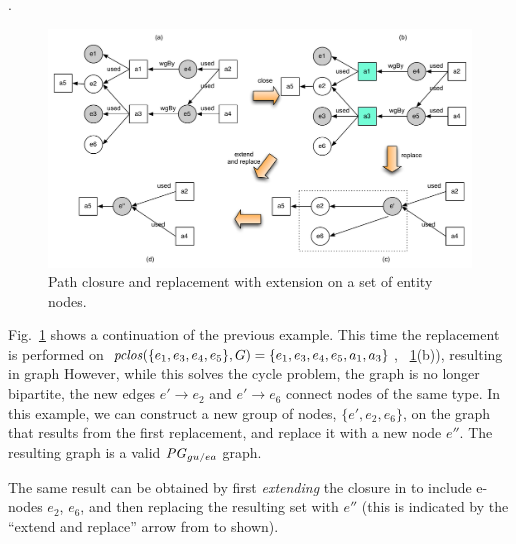   . 



\begin{figure}
\centering
\includegraphics[scale=.5]{figures/convex-ex-1.pdf} 
\caption{Path closure and replacement with extension on a set of entity nodes.} \label{fig:convex-ex-1}
\end{figure}

Fig.~\ref{fig:convex-ex-1} shows a continuation of the previous example. This time the replacement is performed on $\mathit{pclos}(\{e_1, e_3, e_4, e_5\},G) = \{e_1, e_3, e_4, e_5, a_1, a_3\}$, ~\ref{fig:convex-ex-1}(b)),  resulting in graph 
%
However, while this solves the cycle problem, the graph is no longer bipartite,  the new edges $e' \rightarrow e_2$ and $e' \rightarrow e_6$ connect nodes of the same type.
%
In this example, we can construct a new group of nodes, $\{ e', e_2, e_6\}$, on the graph that results from the first replacement, and replace it with a new node $e''$. The resulting graph  is a valid $\mathit{PG}_{gu/ea}$ graph.

%
The same result can be obtained by first \textit{extending} the closure in  to include e-nodes $e_2$, $e_6$, and then replacing the resulting set with $e''$ (this is indicated by the ``extend and replace'' arrow from  to  shown).
%

